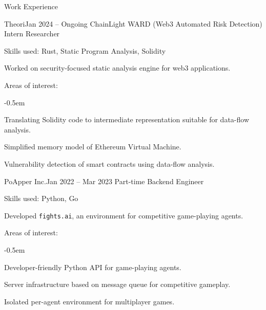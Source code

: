 \documentclass{resume}
\begin{document}
\begin{res-section}{Work Experience}
  \begin{res-subsection}{Theori}{Jan 2024 -- Ongoing}
    ChainLight WARD (Web3 Automated Risk Detection) Intern Researcher

    \item Skills used: Rust, Static Program Analysis, Solidity

    \item Worked on security-focused static analysis engine for web3 applications.

    \item Areas of interest:
    \vspace{-0.5em}
    \begin{list}{--}{}
      \itemsep -0.5em
      \item Translating Solidity code to intermediate representation suitable for data-flow analysis.
      \item Simplified memory model of Ethereum Virtual Machine.
      \item Vulnerability detection of smart contracts using data-flow analysis.
    \end{list}
  \end{res-subsection}

  \begin{res-subsection}{PoApper Inc.}{Jan 2022 -- Mar 2023}
    Part-time Backend Engineer

    \item Skills used: Python, Go

    \item Developed \texttt{fights.ai}, an environment for competitive game-playing agents.

    \item Areas of interest:
    \vspace{-0.5em}
    \begin{list}{--}{}
      \itemsep -0.5em
      \item Developer-friendly Python API for game-playing agents.
      \item Server infrastructure based on message queue for competitive gameplay.
      \item Isolated per-agent environment for multiplayer games.
    \end{list}
  \end{res-subsection}
\end{res-section}
\end{document}
